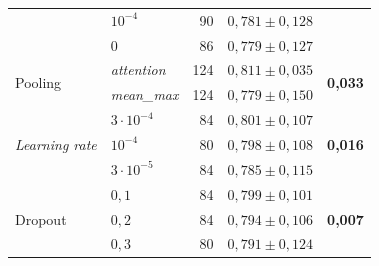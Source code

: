 \documentclass[10pt,a4paper,twocolumn,twoside]{article}
\begin{document}
\begin{table}[H]
\begin{tabular}{llrrl}
  & $10^{-4}$             &  90 & $0{,}781 \pm 0{,}128$ & \\
  & $0$                   &  86 & $0{,}779 \pm 0{,}127$ & \\
\midrule
\multirow{2}{*}{Pooling}
  & \textit{attention}    & 124 & $0{,}811 \pm 0{,}035$ & \multirow{2}{*}{\textbf{0,033}} \\
  & \textit{mean\_max}    & 124 & $0{,}779 \pm 0{,}150$ & \\
\midrule
\multirow{3}{*}{\textit{Learning rate}}
  & $3 \!\cdot\! 10^{-4}$ &  84 & $0{,}801 \pm 0{,}107$ & \multirow{3}{*}{\textbf{0,016}} \\
  & $10^{-4}$             &  80 & $0{,}798 \pm 0{,}108$ & \\
  & $3 \!\cdot\! 10^{-5}$ &  84 & $0{,}785 \pm 0{,}115$ & \\
\midrule
\multirow{3}{*}{Dropout}
  & $0{,}1$               &  84 & $0{,}799 \pm 0{,}101$ & \multirow{3}{*}{\textbf{0,007}} \\
  & $0{,}2$               &  84 & $0{,}794 \pm 0{,}106$ & \\
  & $0{,}3$               &  80 & $0{,}791 \pm 0{,}124$ & \\
\bottomrule
\end{tabular}
\end{table}
\end{document}
